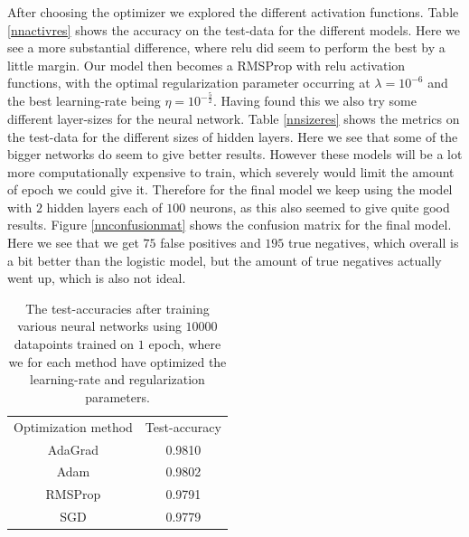 \documentclass{article}
\begin{document}
After choosing the optimizer we explored the different activation functions. Table
\ref{nnactivres} shows the accuracy on the test-data for the different models.
Here we see a more substantial difference, where relu did seem to perform the
best by a little margin. Our model then becomes a RMSProp with relu activation
functions, with the optimal regularization parameter occurring at $\lambda =
	10^{-6}$ and the best learning-rate being $\eta = 10^{-\frac{5}{2}}$. Having
found this we also try some different layer-sizes for the neural network. Table
\ref{nnsizeres} shows the metrics on the test-data for the different sizes of
hidden layers. Here we see that some of the bigger networks do seem to give
better results. However these models will be a lot more computationally
expensive to train, which severely would limit the amount of epoch we could give
it. Therefore for the final model we keep using the model with $2$ hidden layers
each of $100$ neurons, as this also seemed to give quite good results. Figure
\ref{nnconfusionmat} shows the confusion matrix for the final model.  Here we
see that we get $75$ false positives and $195$ true negatives, which overall is
a bit better than the logistic model, but the amount of true negatives actually
went up, which is also not ideal.

\begin{table}
	\centering
	\begin{tabular}{| c | c |}
		Optimization method & Test-accuracy \\
		AdaGrad             & 0.9810        \\
		Adam                & 0.9802        \\
		RMSProp             & 0.9791        \\
		SGD                 & 0.9779
	\end{tabular}
	\caption{The test-accuracies after training various neural networks
		using $10 000$ datapoints trained on $1$ epoch, where we for each
		method have optimized the learning-rate and regularization parameters.}
	\label{nnmethodres}
\end{table}
\end{document}

